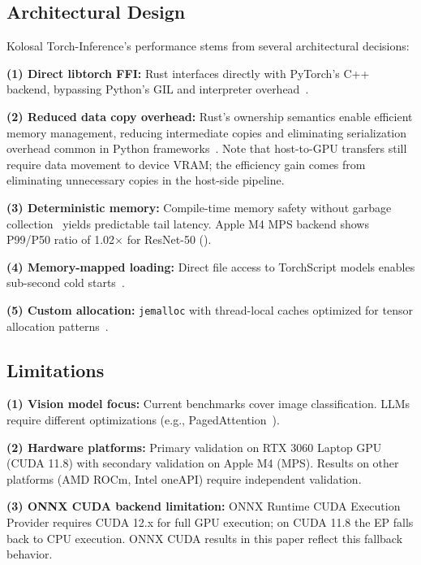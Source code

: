 \documentclass[10pt,twocolumn,a4paper]{article}
\theoremstyle{definition}
\theoremstyle{plain}
\begin{document}
\subsection{Architectural Design}

Kolosal Torch-Inference's performance stems from several architectural decisions:

\textbf{(1) Direct libtorch FFI:} Rust interfaces directly with PyTorch's C++ backend, bypassing Python's GIL and interpreter overhead~\citep{beazley2010gil}.

\textbf{(2) Reduced data copy overhead:} Rust's ownership semantics enable efficient memory management, reducing intermediate copies and eliminating serialization overhead common in Python frameworks~\citep{crankshaw2017clipper}. Note that host-to-GPU transfers still require data movement to device VRAM; the efficiency gain comes from eliminating unnecessary copies in the host-side pipeline.

\textbf{(3) Deterministic memory:} Compile-time memory safety without garbage collection~\citep{jung2017rustbelt} yields predictable tail latency. Apple M4 MPS backend shows P99/P50 ratio of 1.02$\times$ for ResNet-50 ().

\textbf{(4) Memory-mapped loading:} Direct file access to TorchScript models enables sub-second cold starts~\citep{jonas2019serverless}.

\textbf{(5) Custom allocation:} \texttt{jemalloc} with thread-local caches optimized for tensor allocation patterns~\citep{jemalloc2006}.

\subsection{Limitations}

\textbf{(1) Vision model focus:} Current benchmarks cover image classification. LLMs require different optimizations (e.g., PagedAttention~\citep{kwon2023pagedattention}).

\textbf{(2) Hardware platforms:} Primary validation on RTX 3060 Laptop GPU (CUDA 11.8) with secondary validation on Apple M4 (MPS). Results on other platforms (AMD ROCm, Intel oneAPI) require independent validation.

\textbf{(3) ONNX CUDA backend limitation:} ONNX Runtime CUDA Execution Provider requires CUDA 12.x for full GPU execution; on CUDA 11.8 the EP falls back to CPU execution. ONNX CUDA results in this paper reflect this fallback behavior.
\end{document}
